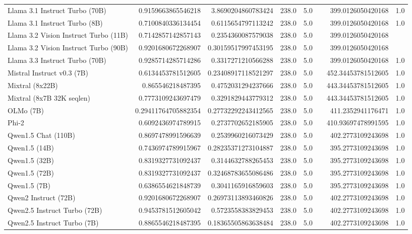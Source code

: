 \begin{table}[htp]
{\begin{tabular}{lrrrrrrr}
Llama 3.1 Instruct Turbo (70B) & 0.9159663865546218 & 3.8690204860783424 & 238.0 & 5.0 &  & 399.0126050420168 & 1.0 \\
Llama 3.1 Instruct Turbo (8B) & 0.7100840336134454 & 0.6115654797113242 & 238.0 & 5.0 &  & 399.0126050420168 & 1.0 \\
Llama 3.2 Vision Instruct Turbo (11B) & 0.7142857142857143 & 0.2354360087579038 & 238.0 & 5.0 &  & 399.0126050420168 &  \\
Llama 3.2 Vision Instruct Turbo (90B) & 0.9201680672268907 & 0.30159517997453195 & 238.0 & 5.0 &  & 399.0126050420168 &  \\
Llama 3.3 Instruct Turbo (70B) & 0.9285714285714286 & 0.3317271210566288 & 238.0 & 5.0 &  & 399.0126050420168 & 1.0 \\
Mistral Instruct v0.3 (7B) & 0.6134453781512605 & 0.23408917118521297 & 238.0 & 5.0 &  & 452.34453781512605 & 1.0 \\
Mixtral (8x22B) & 0.865546218487395 & 0.4752031294237666 & 238.0 & 5.0 &  & 443.34453781512605 & 1.0 \\
Mixtral (8x7B 32K seqlen) & 0.7773109243697479 & 0.3291829443779312 & 238.0 & 5.0 &  & 443.34453781512605 & 1.0 \\
OLMo (7B) & 0.29411764705882354 & 0.27732292243412565 & 238.0 & 5.0 &  & 411.2352941176471 & 1.0 \\
Phi-2 & 0.6092436974789915 & 0.2737702652185905 & 238.0 & 5.0 &  & 410.93697478991595 & 1.0 \\
Qwen1.5 Chat (110B) & 0.8697478991596639 & 0.2539960216073429 & 238.0 & 5.0 &  & 402.2773109243698 & 1.0 \\
Qwen1.5 (14B) & 0.7436974789915967 & 0.28235371273104887 & 238.0 & 5.0 &  & 395.2773109243698 & 1.0 \\
Qwen1.5 (32B) & 0.8319327731092437 & 0.3144632788265453 & 238.0 & 5.0 &  & 395.2773109243698 & 1.0 \\
Qwen1.5 (72B) & 0.8319327731092437 & 0.32468783655086486 & 238.0 & 5.0 &  & 395.2773109243698 & 1.0 \\
Qwen1.5 (7B) & 0.6386554621848739 & 0.3041165916859603 & 238.0 & 5.0 &  & 395.2773109243698 & 1.0 \\
Qwen2 Instruct (72B) & 0.9201680672268907 & 0.26973113893460826 & 238.0 & 5.0 &  & 402.2773109243698 & 1.0 \\
Qwen2.5 Instruct Turbo (72B) & 0.9453781512605042 & 0.5723558383829453 & 238.0 & 5.0 &  & 402.2773109243698 & 1.0 \\
Qwen2.5 Instruct Turbo (7B) & 0.8865546218487395 & 0.18365505863638484 & 238.0 & 5.0 &  & 402.2773109243698 & 1.0 \\

\end{tabular}}
\end{table}

